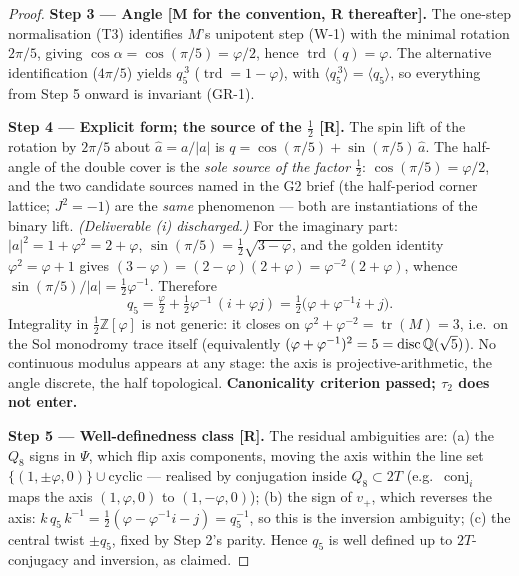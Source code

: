 \documentclass[11pt,a4paper]{article}
\theoremstyle{plain}
\theoremstyle{definition}
\theoremstyle{remark}
\newcommand{\Zphi}{\mathbb{Z}[\varphi]}
\newcommand{\conj}[1]{\operatorname{conj}_{#1}}
\newcommand{\rtag}[1]{\textnormal{\textbf{[#1]}}}
\DeclareMathOperator{\trd}{trd}
\DeclareMathOperator{\disc}{disc}
\begin{document}
\begin{proof}
\medskip
\textbf{Step 3 --- Angle \rtag{M for the convention, R thereafter}.}
The one-step normalisation (T3) identifies $M$'s unipotent step (W-1) with the minimal rotation $2\pi/5$, giving $\cos\alpha = \cos(\pi/5) = \varphi/2$, hence $\trd(q) = \varphi$. The alternative identification ($4\pi/5$) yields $q_5^{\,3}$ ($\trd = 1 - \varphi$), with $\langle q_5^{\,3}\rangle = \langle q_5\rangle$, so everything from Step 5 onward is invariant (GR-1).

\medskip
\textbf{Step 4 --- Explicit form; the source of the $\tfrac12$ \rtag{R}.}
The spin lift of the rotation by $2\pi/5$ about $\hat a = a/|a|$ is $q = \cos(\pi/5) + \sin(\pi/5)\,\hat a$. The half-angle of the double cover is the \emph{sole source of the factor $\tfrac12$}: $\cos(\pi/5) = \varphi/2$, and the two candidate sources named in the G2 brief (the half-period corner lattice; $J^2 = -1$) are the \emph{same} phenomenon --- both are instantiations of the binary lift. \emph{(Deliverable (i) discharged.)} For the imaginary part: $|a|^2 = 1 + \varphi^2 = 2 + \varphi$, $\sin(\pi/5) = \tfrac12\sqrt{3 - \varphi}$, and the golden identity $\varphi^2 = \varphi + 1$ gives $(3-\varphi) = (2-\varphi)(2+\varphi) = \varphi^{-2}(2+\varphi)$, whence $\sin(\pi/5)/|a| = \tfrac12\varphi^{-1}$. Therefore
\begin{equation}
q_5 = \tfrac{\varphi}{2} + \tfrac12\varphi^{-1}\,(i + \varphi j) = \tfrac12\big(\varphi + \varphi^{-1} i + j\big).
\end{equation}
Integrality in $\tfrac12\Zphi$ is not generic: it closes on $\varphi^2 + \varphi^{-2} = \operatorname{tr}(M) = 3$, i.e.\ on the Sol monodromy trace itself (equivalently $(\varphi + \varphi^{-1})^2 = 5 = \disc\Q(\sqrt5)$). No continuous modulus appears at any stage: the axis is projective-arithmetic, the angle discrete, the half topological. \textbf{Canonicality criterion passed; $\tau_2$ does not enter.}

\medskip
\textbf{Step 5 --- Well-definedness class \rtag{R}.}
The residual ambiguities are: (a) the $Q_8$ signs in $\Psi$, which flip axis components, moving the axis within the line set $\{(1, \pm\varphi, 0)\} \cup \text{cyclic}$ --- realised by conjugation inside $Q_8 \subset 2T$ (e.g.\ $\conj{i}$ maps the axis $(1,\varphi,0)$ to $(1,-\varphi,0)$); (b) the sign of $v_+$, which reverses the axis: $k\, q_5\, k^{-1} = \tfrac12(\varphi - \varphi^{-1}i - j) = q_5^{-1}$, so this is the inversion ambiguity; (c) the central twist $\pm q_5$, fixed by Step 2's parity. Hence $q_5$ is well defined up to $2T$-conjugacy and inversion, as claimed.
\end{proof}
\end{document}

